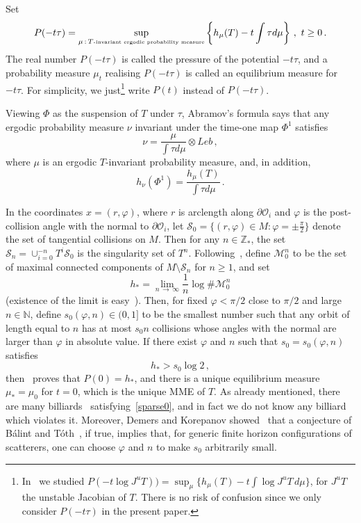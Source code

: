 \documentclass[AHL,Unicode,longabstracts,published]{cedram}
\newcommand{\MM}{\mathcal{M}}
\newcommand{\OO}{\mathcal{O}}
\newcommand{\cS}{\mathcal{S}}
\newcommand{\bbN}{\mathbb{N}}
\newcommand{\bbZ}{\mathbb{Z}}
\newcommand{\vf}{\varphi}
\begin{document}
Set
\[
P(-t\tau)=\sup_{\mu\,:\,T\text{\tiny{-invariant ergodic probability measure}}}
\left\{h_\mu(T)-t \int \tau d \mu \right\} \,, \,\,t\ge 0\,.
\]
The real number $P(-t \tau)$ is called the pressure of the potential $-t\tau$, and a probability measure $\mu_t$ realising $P(-t \tau)$ is called an equilibrium measure for $-t\tau$. For simplicity, we just\footnote{In~\cite{BD2} we studied $P(-t\log J^u T))=\sup_\mu \{h_\mu(T)-t \int \log J^u T \, d \mu \} $, for $J^uT$ the unstable Jacobian of $T$. There is no risk of confusion since we only consider $P(-t\tau)$ in the present paper.} write $P(t)$ instead of $P(-t\tau)$.

Viewing $\Phi$ as the suspension of $T$ under $\tau$, Abramov's formula says that any ergodic probability measure $\nu$ invariant under the time-one map $\Phi^1$ satisfies
\begin{equation}\label{Abr0}
\nu=\frac{\mu}{\int \tau d \mu} \otimes Leb\,,
\end{equation}
where $\mu$ is an ergodic $T$-invariant probability measure, and, in addition,
\begin{equation}\label{Abr}
h_\nu(\Phi ^1) =\frac{h_\mu(T)}{\int \tau d \mu} \,.
\end{equation}


In the coordinates $x = (r,\vf)$, where $r$ is arclength along $\partial \OO_i$ and $\vf$ is the post-collision angle with the normal to $\partial \OO_i$, let $\cS_0 = \{ (r, \vf) \in M: \vf = \pm \frac{\pi}{2} \}$ denote the set of tangential collisions on $M$. Then for any $n\in \bbZ_*$, the set $
\cS_n = \cup_{i=0}^{-n} T^i\cS_0$ is the singularity set of $T^n$. Following~\cite{BD1}, define $\MM_0^n$ to be the set of maximal connected components of $M \setminus \cS_n$ for $n\ge 1$, and set
\begin{equation}\label{defh}
h_*=\lim_{n\,\to\,\infty} \frac 1 n \log \# \MM_0^n
\end{equation}
(existence of the limit is easy~\cite{BD1}). Then, for fixed $\vf<\pi/2$ close to $\pi/2$ and large $n \in \bbN$, define $s_0(\vf,n) \in (0,1]$ to be the smallest number such that any orbit of length equal to $n$ has at most $s_0n$ collisions whose angles with the normal are larger than $\vf$ in absolute value. If there exist $\varphi$ and $n$ such that $s_0 = s_0(\vf,n)$ satisfies
\begin{equation}\label{sparse0}
h_*> s_0\log 2 \,,
\end{equation}
then~\cite{BD1} proves that $P(0)=h_*$, and there is a unique equilibrium measure $\mu_*=\mu_0$ for $t=0$, which is the unique MME of $T$. As already mentioned, there are many billiards~\cite[\S~2.4]{BD1} satisfying~\eqref{sparse0}, and in fact we do not know any billiard which violates it. Moreover, Demers and Korepanov showed~\cite{DK} that a conjecture of Bálint and Tóth~\cite{balint-toth}, if true, implies that, for generic finite horizon configurations of scatterers, one can choose $\vf$ and $n$ to make $s_0$ arbitrarily small.
\end{document}
